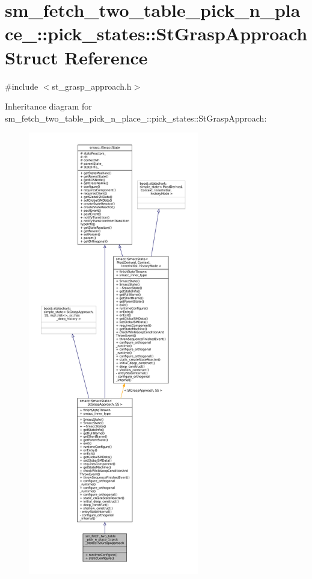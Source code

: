\hypertarget{structsm__fetch__two__table__pick__n__place__1_1_1pick__states_1_1StGraspApproach}{}\section{sm\+\_\+fetch\+\_\+two\+\_\+table\+\_\+pick\+\_\+n\+\_\+place\+\_\+:\+:pick\+\_\+states\+:\+:St\+Grasp\+Approach Struct Reference}
\label{structsm__fetch__two__table__pick__n__place__1_1_1pick__states_1_1StGraspApproach}


{\ttfamily \#include $<$st\+\_\+grasp\+\_\+approach.\+h$>$}



Inheritance diagram for sm\+\_\+fetch\+\_\+two\+\_\+table\+\_\+pick\+\_\+n\+\_\+place\+\_\+:\+:pick\+\_\+states\+:\+:St\+Grasp\+Approach\+:
\nopagebreak
\begin{figure}[H]
\begin{center}
\leavevmode
\includegraphics[height=550pt]{structsm__fetch__two__table__pick__n__place__1_1_1pick__states_1_1StGraspApproach__inherit__graph}
\end{center}
\end{figure}


